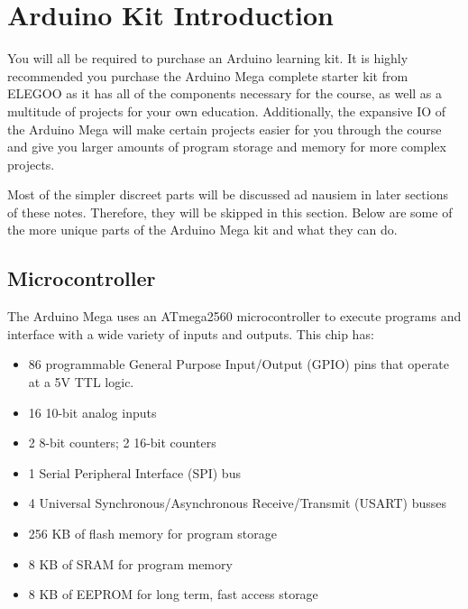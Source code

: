 

\pagebreak


\section*{Arduino Kit Introduction}

You will all be required to purchase an Arduino learning kit. 
It is highly recommended you purchase the Arduino Mega complete starter kit from ELEGOO as it has all of the components necessary for the course, as well as a multitude of projects for your own education.
Additionally, the expansive IO of the Arduino Mega will make certain projects easier for you through the course and give you larger amounts of program storage and memory for more complex projects.

Most of the simpler discreet parts will be discussed ad nausiem in later sections of these notes.
Therefore, they will be skipped in this section.
Below are some of the more unique parts of the Arduino Mega kit and what they can do.
    
    \subsection*{Microcontroller}
    The Arduino Mega uses an ATmega2560 microcontroller to execute programs and interface with a wide variety of inputs and outputs.
    This chip has:
    \begin{itemize}
        \item 86 programmable General Purpose Input/Output (GPIO) pins that operate at a 5V TTL logic.
        \item 16 10-bit analog inputs
        \item 2 8-bit counters; 2 16-bit counters
        \item 1 Serial Peripheral Interface (SPI) bus
        \item 4 Universal Synchronous/Asynchronous Receive/Transmit (USART) busses
        \item 256 KB of flash memory for program storage
        \item 8 KB of SRAM for program memory
        \item 8 KB of EEPROM for long term, fast access storage
    \end{itemize}

